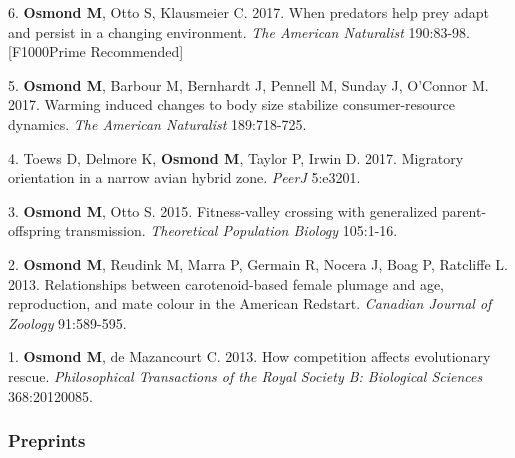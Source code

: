 \documentclass[12pt]{article}
\begin{document}
\noindent\hspace{.1cm}6. \textbf{Osmond M}, Otto S, Klausmeier C. 2017. When predators help prey adapt and persist in a changing environment. \textit{The American Naturalist} 190:83-98. [F1000Prime Recommended]

\noindent\hspace{.1cm}5. \textbf{Osmond M}, Barbour M, Bernhardt J, Pennell M, Sunday J, O'Connor M. 2017. Warming induced changes to body size stabilize consumer-resource dynamics. \textit{The American Naturalist} 189:718-725.

\noindent\hspace{.1cm}4. Toews D, Delmore K, \textbf{Osmond M}, Taylor P, Irwin D. 2017. Migratory orientation in a narrow avian hybrid zone. \textit{PeerJ} 5:e3201.

\noindent\hspace{.1cm}3. \textbf{Osmond M}, Otto S. 2015. Fitness-valley crossing with generalized parent-offspring transmission. \textit{Theoretical Population Biology} 105:1-16. %

\noindent\hspace{.1cm}2. \textbf{Osmond M}, Reudink M, Marra P, Germain R, Nocera J,  Boag P, Ratcliffe L.  2013. Relationships between carotenoid-based female plumage and age, reproduction, and mate colour in the American Redstart. \textit{Canadian Journal of Zoology} 91:589-595. %

\noindent\hspace{.1cm}1. \textbf{Osmond M}, de Mazancourt C. 2013. How competition affects evolutionary rescue. \textit{Philosophical Transactions of the Royal Society B: Biological Sciences} 368:20120085. %

%

\subsubsection*{Preprints}
\end{document}
